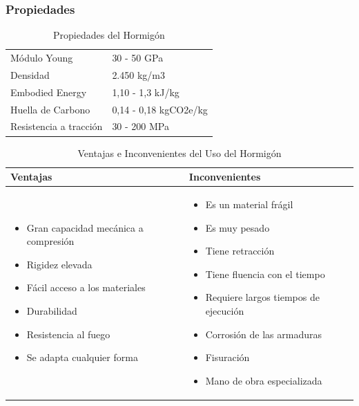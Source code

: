 \subsubsection*{Propiedades}

\begin{table}
    \centering
    \caption{Propiedades del Hormigón}
    \label{tab: Propiedades del Hormigón}
    \begin{tabular}{| l | l |}
        \hline
        Módulo Young & 30 - 50 GPa \\
        Densidad & 2.450 kg/m3 \\
        Embodied Energy & 1,10 - 1,3 kJ/kg \\
        Huella de Carbono & 0,14 - 0,18 kgCO2e/kg \\
        Resistencia a tracción & 30 - 200 MPa \\
        \hline
    \end{tabular}
\end{table}

\begin{table}
    \centering
    \caption{Ventajas e Inconvenientes del Uso del Hormigón}
    \label{tab: Ventajas y Desventajas del Hormigón}

    \begin{tabularx}{\columnwidth}{|>{\raggedright\arraybackslash}X|>{\raggedright\arraybackslash}X|}
    \hline
    \textbf{Ventajas} & \textbf{Inconvenientes} \\
    \hline

    \begin{itemize}
        \item Gran capacidad mecánica a compresión
        \item Rigidez elevada
        \item Fácil acceso a los materiales
        \item Durabilidad
        \item Resistencia al fuego
        \item Se adapta cualquier forma
    \end{itemize}

    &

    \begin{itemize}
        \item Es un material frágil
        \item Es muy pesado
        \item Tiene retracción
        \item Tiene fluencia con el tiempo
        \item Requiere largos tiempos de ejecución
        \item Corrosión de las armaduras
        \item Fisuración
        \item Mano de obra especializada
    \end{itemize} \\
    \hline
    \end{tabularx}
\end{table}

